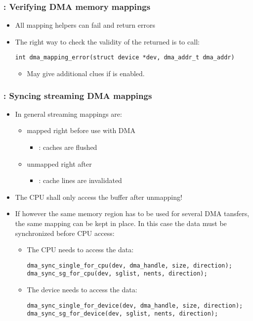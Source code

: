 \begin{frame}[fragile]
  \frametitle{: Verifying DMA memory mappings}
  \begin{itemize}
  \item All mapping helpers can fail and return errors
  \item The right way to check the validity of the returned
     is to call:
\begin{verbatim}
int dma_mapping_error(struct device *dev, dma_addr_t dma_addr)
\end{verbatim}
    \begin{itemize}
    \item May give additional clues if  is
      enabled.
    \end{itemize}
  \end{itemize}
\end{frame}

\begin{frame}[fragile]
  \frametitle{: Syncing streaming DMA mappings}
  \begin{itemize}
  \item In general streaming mappings are:
    \begin{itemize}
    \item mapped right before use with DMA
      \begin{itemize}
      \item {}: caches are flushed
      \end{itemize}
    \item unmapped right after
      \begin{itemize}
      \item {}: cache lines are invalidated
      \end{itemize}
    \end{itemize}
  \item The CPU shall only access the buffer after unmapping!
  \item If however the same memory region has to be used for several DMA
    tansfers, the same mapping can be kept in place. In this case the
    data must be synchronized before CPU access:
    \begin{itemize}
    \item The CPU needs to access the data:
\begin{verbatim}
dma_sync_single_for_cpu(dev, dma_handle, size, direction);
dma_sync_sg_for_cpu(dev, sglist, nents, direction);
\end{verbatim}
    \item The device needs to access the data:
\begin{verbatim}
dma_sync_single_for_device(dev, dma_handle, size, direction);
dma_sync_sg_for_device(dev, sglist, nents, direction);
\end{verbatim}
    \end{itemize}
  \end{itemize}
\end{frame}

